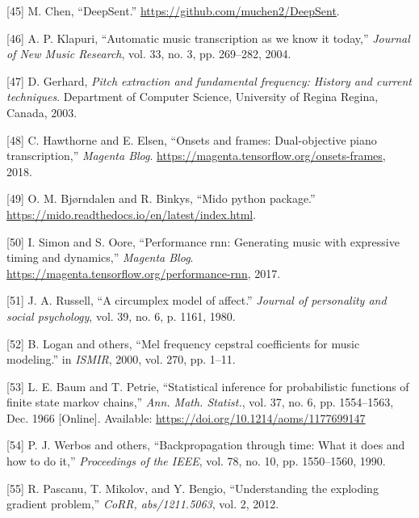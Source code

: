 \documentclass[12pt,]{article}
\begin{document}
\leavevmode\hypertarget{ref-deepsent}{}%
{[}45{]} M. Chen, ``DeepSent.''
\url{https://github.com/muchen2/DeepSent}.

\leavevmode\hypertarget{ref-klapuri2004automatic}{}%
{[}46{]} A. P. Klapuri, ``Automatic music transcription as we know it
today,'' \emph{Journal of New Music Research}, vol. 33, no. 3, pp.
269--282, 2004.

\leavevmode\hypertarget{ref-gerhard2003pitch}{}%
{[}47{]} D. Gerhard, \emph{Pitch extraction and fundamental frequency:
History and current techniques}. Department of Computer Science,
University of Regina Regina, Canada, 2003.

\leavevmode\hypertarget{ref-onsetsblog}{}%
{[}48{]} C. Hawthorne and E. Elsen, ``Onsets and frames: Dual-objective
piano transcription,'' \emph{Magenta Blog}.
\url{https://magenta.tensorflow.org/onsets-frames}, 2018.

\leavevmode\hypertarget{ref-mido}{}%
{[}49{]} O. M. Bjørndalen and R. Binkys, ``Mido python package.'' \\
\url{https://mido.readthedocs.io/en/latest/index.html}.

\leavevmode\hypertarget{ref-performance-rnn-2017}{}%
{[}50{]} I. Simon and S. Oore, ``Performance rnn: Generating music with
expressive timing and dynamics,'' \emph{Magenta Blog}.
\url{https://magenta.tensorflow.org/performance-rnn}, 2017.

\leavevmode\hypertarget{ref-russell1980circumplex}{}%
{[}51{]} J. A. Russell, ``A circumplex model of affect.'' \emph{Journal
of personality and social psychology}, vol. 39, no. 6, p. 1161, 1980.

\leavevmode\hypertarget{ref-logan2000mel}{}%
{[}52{]} B. Logan and others, ``Mel frequency cepstral coefficients for
music modeling.'' in \emph{ISMIR}, 2000, vol. 270, pp. 1--11.

\leavevmode\hypertarget{ref-baum1966}{}%
{[}53{]} L. E. Baum and T. Petrie, ``Statistical inference for
probabilistic functions of finite state markov chains,'' \emph{Ann.
Math. Statist.}, vol. 37, no. 6, pp. 1554--1563, Dec. 1966 {[}Online{]}.
Available: \url{https://doi.org/10.1214/aoms/1177699147}

\leavevmode\hypertarget{ref-werbos1990backpropagation}{}%
{[}54{]} P. J. Werbos and others, ``Backpropagation through time: What
it does and how to do it,'' \emph{Proceedings of the IEEE}, vol. 78, no.
10, pp. 1550--1560, 1990.

\leavevmode\hypertarget{ref-pascanu2012understanding}{}%
{[}55{]} R. Pascanu, T. Mikolov, and Y. Bengio, ``Understanding the
exploding gradient problem,'' \emph{CoRR, abs/1211.5063}, vol. 2, 2012.
\end{document}
